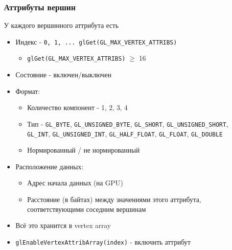 \documentclass{beamer}
\begin{document}
\begin{frame}[fragile]
\frametitle{Аттрибуты вершин}
У каждого вершинного аттрибута есть
\begin{itemize}
\item Индекс - \verb|0, 1, ... glGet(GL_MAX_VERTEX_ATTRIBS)|
\pause
\begin{itemize}
\item \verb|glGet(GL_MAX_VERTEX_ATTRIBS)| \begin{math}\geq\end{math} 16
\end{itemize}
\pause
\item Состояние - включен/выключен
\pause
\item Формат:
\begin{itemize}
\item Количество компонент - 1, 2, 3, 4
\pause
\item Тип - \verb|GL_BYTE|, \verb|GL_UNSIGNED_BYTE|, \verb|GL_SHORT|, \verb|GL_UNSIGNED_SHORT|, \verb|GL_INT|, \verb|GL_UNSIGNED_INT|, \verb|GL_HALF_FLOAT|, \verb|GL_FLOAT|, \verb|GL_DOUBLE|
\pause
\item Нормированный / не нормированный
\end{itemize}
\pause
\item Расположение данных:
\begin{itemize}
\item Адрес начала данных (на GPU)
\item Расстояние (в байтах) между значениями этого аттрибута, соответствующими соседним вершинам
\end{itemize}
\pause
\item Всё это хранится в vertex array
\pause
\item \verb|glEnableVertexAttribArray(index)| - включить аттрибут
\end{itemize}
\end{frame}
\end{document}
